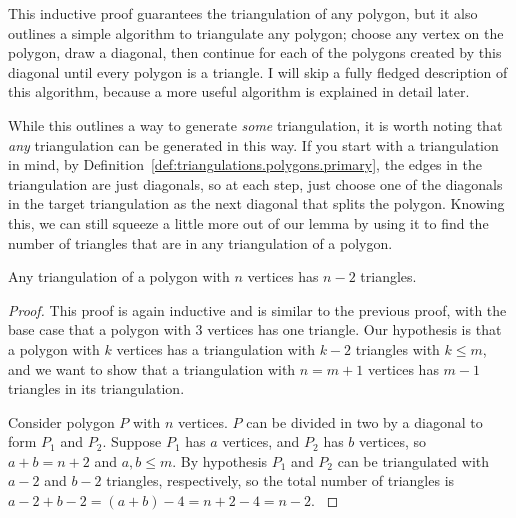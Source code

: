 This inductive proof guarantees the triangulation of any polygon, but it also outlines a simple algorithm to triangulate any polygon;
choose any vertex on the polygon, draw a diagonal, then continue for each of the polygons created by this diagonal until every polygon is a triangle.
I will skip a fully fledged description of this algorithm, because a more useful algorithm is explained in detail later.

While this outlines a way to generate \textit{some} triangulation, it is worth noting that \textit{any} triangulation can be generated in this way.
If you start with a triangulation in mind, by Definition~\ref{def:triangulations.polygons.primary}, the edges in the triangulation are just diagonals, so at each step, just choose one of the diagonals in the target triangulation as the next diagonal that splits the polygon.
Knowing this, we can still squeeze a little more out of our lemma by using it to find the number of triangles that are in any triangulation of a polygon.

\begin{theorem}
	Any triangulation of a polygon with $n$ vertices has $n-2$ triangles.
\end{theorem}
\begin{proof}
	This proof is again inductive and is similar to the previous proof, with the base case that a polygon with 3 vertices has one triangle.
	Our hypothesis is that a polygon with $k$ vertices has a triangulation with $k-2$ triangles with $k\le m$, and we want to show that a triangulation with $n=m+1$ vertices has $m-1$ triangles in its triangulation.

	Consider polygon $P$ with $n$ vertices.
	$P$ can be divided in two by a diagonal to form $P_1$ and $P_2$.
	Suppose $P_1$ has $a$ vertices, and $P_2$ has $b$ vertices, so $a+b = n+2$ and $a, b \le m$.
	By hypothesis $P_1$ and $P_2$ can be triangulated with $a-2$ and $b-2$ triangles, respectively, so the total number of triangles is $a-2+b-2 = (a+b)-4 = n+2-4 = n-2$.
	\label{thrm:triangulations.polygons.n_triangles}
\end{proof}
